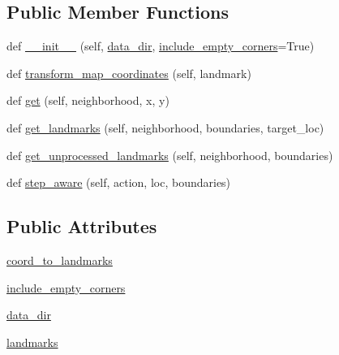 \subsection*{Public Member Functions}
\begin{DoxyCompactItemize}
\item 
def \hyperlink{classparlai_1_1tasks_1_1talkthewalk_1_1worlds_1_1Map_a09c659a2c010b978fb69b4f578088e3b}{\+\_\+\+\_\+init\+\_\+\+\_\+} (self, \hyperlink{classparlai_1_1tasks_1_1talkthewalk_1_1worlds_1_1Map_afdf228371d0f141ece9b3889faabe095}{data\+\_\+dir}, \hyperlink{classparlai_1_1tasks_1_1talkthewalk_1_1worlds_1_1Map_a8d069664effce0d3bf691ff46e6e76fc}{include\+\_\+empty\+\_\+corners}=True)
\item 
def \hyperlink{classparlai_1_1tasks_1_1talkthewalk_1_1worlds_1_1Map_a2d84b1c786b7ed2dede242e909375711}{transform\+\_\+map\+\_\+coordinates} (self, landmark)
\item 
def \hyperlink{classparlai_1_1tasks_1_1talkthewalk_1_1worlds_1_1Map_abb0b69a2cbaa77c9e422c0a7dc039974}{get} (self, neighborhood, x, y)
\item 
def \hyperlink{classparlai_1_1tasks_1_1talkthewalk_1_1worlds_1_1Map_af080964b1e6043ad8d6e1634932c82ca}{get\+\_\+landmarks} (self, neighborhood, boundaries, target\+\_\+loc)
\item 
def \hyperlink{classparlai_1_1tasks_1_1talkthewalk_1_1worlds_1_1Map_adc7aa565cd5b7e90f6741e1b90632b92}{get\+\_\+unprocessed\+\_\+landmarks} (self, neighborhood, boundaries)
\item 
def \hyperlink{classparlai_1_1tasks_1_1talkthewalk_1_1worlds_1_1Map_a3c59a7fa515ceefb772da1f807021b85}{step\+\_\+aware} (self, action, loc, boundaries)
\end{DoxyCompactItemize}
\subsection*{Public Attributes}
\begin{DoxyCompactItemize}
\item 
\hyperlink{classparlai_1_1tasks_1_1talkthewalk_1_1worlds_1_1Map_af3a12a8efd0afe26740e2b9b7a362614}{coord\+\_\+to\+\_\+landmarks}
\item 
\hyperlink{classparlai_1_1tasks_1_1talkthewalk_1_1worlds_1_1Map_a8d069664effce0d3bf691ff46e6e76fc}{include\+\_\+empty\+\_\+corners}
\item 
\hyperlink{classparlai_1_1tasks_1_1talkthewalk_1_1worlds_1_1Map_afdf228371d0f141ece9b3889faabe095}{data\+\_\+dir}
\item 
\hyperlink{classparlai_1_1tasks_1_1talkthewalk_1_1worlds_1_1Map_a11ed4a0cac5c44b1a61dc702378e5b9f}{landmarks}
\end{DoxyCompactItemize}



